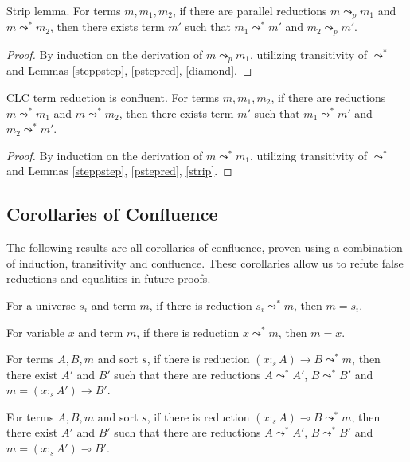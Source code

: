 \documentclass[sigplan,screen,review,anonymous]{acmart}
\newcommand{\stype}[1]{:_#1}
\newcommand{\red}{\leadsto^*}
\newcommand{\pstep}{\leadsto_p}
\begin{document}
\begin{lemma}\label{strip}
  Strip lemma. For terms $m, m_1, m_2$, if there are parallel reductions $m \pstep m_1$ and $m \red m_2$, then there exists term $m'$ such that $m_1 \red m'$ and $m_2 \pstep m'$.
\end{lemma}
\begin{proof}
  By induction on the derivation of $m \pstep m_1$, utilizing transitivity of $\red$ and Lemmas \ref{steppstep}, \ref{pstepred}, \ref{diamond}.
\end{proof}

\begin{theorem}
  CLC term reduction is confluent. For terms $m, m_1, m_2$, if there are reductions $m \red m_1$ and $m \red m_2$, then there exists term $m'$ such that $m_1 \red m'$ and $m_2 \red m'$.
\end{theorem}
\begin{proof}
  By induction on the derivation of $m \red m_1$, utilizing transitivity of $\red$ and Lemmas \ref{steppstep}, \ref{pstepred}, \ref{strip}.
\end{proof}

\subsection{Corollaries of Confluence}
The following results are all corollaries of confluence, proven using a combination of induction, transitivity and confluence. These corollaries allow us to refute false reductions and equalities in future proofs.

\begin{corollary}\label{redsortinv}
  For a universe $s_i$ and term $m$, if there is reduction $s_i \red m$, then $m = s_i$.
\end{corollary}

\begin{corollary}\label{redvarinv}
  For variable $x$ and term $m$, if there is reduction $x \red m$, then $m = x$.
\end{corollary}

\begin{corollary}\label{redarrowinv}
  For terms $A, B, m$ and sort $s$, if there is reduction $(x \stype{s} A) \rightarrow B \red m$, then there exist $A'$ and $B'$ such that there are reductions $A \red A'$, $B \red B'$ and $m = (x \stype{s} A') \rightarrow B'$.
\end{corollary}

\begin{corollary}\label{redlolliinv}
  For terms $A, B, m$ and sort $s$, if there is reduction $(x \stype{s} A) \multimap B \red m$, then there exist $A'$ and $B'$ such that there are reductions $A \red A'$, $B \red B'$ and $m = (x \stype{s} A') \multimap B'$.
\end{corollary}
\end{document}
